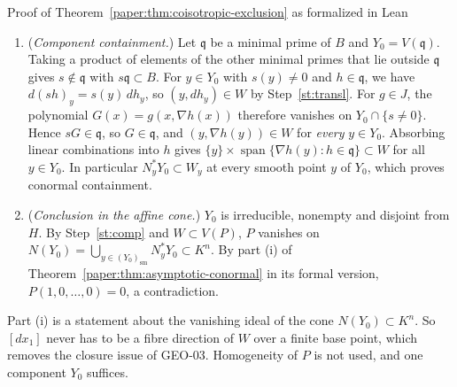 \documentclass[11pt]{amsart}
\numberwithin{equation}{section}
\theoremstyle{plain}
\theoremstyle{remark}
\newcommand{\sm}{\mathrm{sm}}
\begin{document}
\begin{AIaddition}{Proof of Theorem~\ref{paper:thm:coisotropic-exclusion} as formalized in Lean}
\begin{enumerate}[label=\textbf{Step \arabic*.},ref=\arabic*,leftmargin=*,widest=5]
\item\label{st:comp} (\emph{Component containment.}) Let $\mathfrak q$ be a minimal prime of $B$ and
$Y_0=V(\mathfrak q)$. Taking a product of elements of the other minimal primes
that lie outside $\mathfrak q$ gives $s\notin\mathfrak q$ with $s\mathfrak q\subset B$.
For $y\in Y_0$ with $s(y)\neq0$ and $h\in\mathfrak q$, we have $d(sh)_y=s(y)\,dh_y$, so
$(y,dh_y)\in W$ by Step~\ref{st:transl}. For $g\in J$, the polynomial
$G(x)=g(x,\nabla h(x))$ therefore vanishes on $Y_0\cap\{s\neq0\}$. Hence
$sG\in\mathfrak q$, so $G\in\mathfrak q$, and $(y,\nabla h(y))\in W$ for \emph{every}
$y\in Y_0$. Absorbing linear combinations into $h$ gives
$\{y\}\times\operatorname{span}\{\nabla h(y):h\in\mathfrak q\}\subset W$ for all $y\in Y_0$. In particular
$N^*_yY_0\subset W_y$ at every smooth point $y$ of $Y_0$, which proves conormal containment.
\item\label{st:asym} (\emph{Conclusion in the affine cone.}) $Y_0$ is irreducible, nonempty and
disjoint from $H$. By Step~\ref{st:comp} and $W\subset V(P)$, $P$ vanishes on
$N(Y_0)=\bigcup_{y\in(Y_0)_{\sm}}N^*_yY_0\subset K^n$. By part (i) of
Theorem~\ref{paper:thm:asymptotic-conormal} in its formal version, $P(1,0,\dots,0)=0$,
a contradiction.
\end{enumerate}
Part (i) is a statement about the vanishing ideal of the cone
$N(Y_0)\subset K^n$. So $[dx_1]$ never has to be a fibre direction of $W$ over a
finite base point, which removes the closure issue of GEO-03. Homogeneity of $P$ is
not used, and one component $Y_0$ suffices.
\end{AIaddition}
\end{document}
